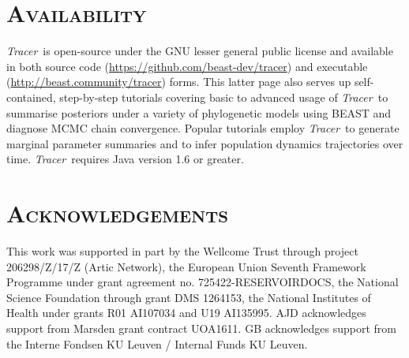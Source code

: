 \documentclass[webpdf,mynatbib,nosurname,nogrid,noCE,noMSC]{SYS}
\newcommand{\tracer}{\emph{Tracer}}
\begin{document}
\vspace{-0.55cm}

\section*{\textsc{Availability}}

\tracer\ is open-source under the GNU lesser general public license and available in both source code (\url{https://github.com/beast-dev/tracer}) and executable (\url{http://beast.community/tracer}) forms.
This latter page also serves up self-contained, step-by-step tutorials covering basic to advanced usage of \tracer\ to summarise posteriors under a variety of phylogenetic models using BEAST and diagnose MCMC chain convergence.
Popular tutorials employ \tracer\ to generate marginal parameter summaries and to infer population dynamics trajectories over time.
\tracer\ requires Java version 1.6 or greater.

\vspace{-0.55cm}

\section*{\textsc{Acknowledgements}}

This work was supported in part by the Wellcome Trust through project 206298/Z/17/Z (Artic Network), the European Union Seventh Framework Programme under grant agreement no. 725422-RESERVOIRDOCS, the National Science Foundation through grant DMS 1264153, the National Institutes of Health under grants R01 AI107034 and U19 AI135995. AJD acknowledges support from Marsden grant contract UOA1611.
GB acknowledges support from the Interne Fondsen KU Leuven / Internal Funds KU Leuven.

\vspace*{-2em}



\end{document}
